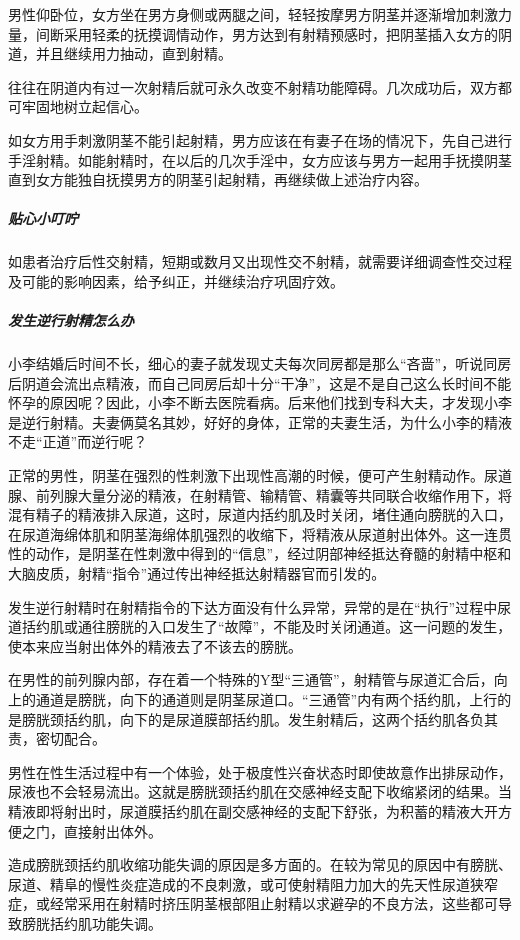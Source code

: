 \begin{enumerate}
男性仰卧位，女方坐在男方身侧或两腿之间，轻轻按摩男方阴茎并逐渐增加刺激力量，间断采用轻柔的抚摸调情动作，男方达到有射精预感时，把阴茎插入女方的阴道，并且继续用力抽动，直到射精。

往往在阴道内有过一次射精后就可永久改变不射精功能障碍。几次成功后，双方都可牢固地树立起信心。

如女方用手刺激阴茎不能引起射精，男方应该在有妻子在场的情况下，先自己进行手淫射精。如能射精时，在以后的几次手淫中，女方应该与男方一起用手抚摸阴茎直到女方能独自抚摸男方的阴茎引起射精，再继续做上述治疗内容。

\subparagraph{贴心小叮咛}

如患者治疗后性交射精，短期或数月又出现性交不射精，就需要详细调查性交过程及可能的影响因素，给予纠正，并继续治疗巩固疗效。

\subparagraph{发生逆行射精怎么办}

小李结婚后时间不长，细心的妻子就发现丈夫每次同房都是那么“吝啬”，听说同房后阴道会流出点精液，而自己同房后却十分“干净”，这是不是自己这么长时间不能怀孕的原因呢？因此，小李不断去医院看病。后来他们找到专科大夫，才发现小李是逆行射精。夫妻俩莫名其妙，好好的身体，正常的夫妻生活，为什么小李的精液不走“正道”而逆行呢？

正常的男性，阴茎在强烈的性刺激下出现性高潮的时候，便可产生射精动作。尿道腺、前列腺大量分泌的精液，在射精管、输精管、精囊等共同联合收缩作用下，将混有精子的精液排入尿道，这时，尿道内括约肌及时关闭，堵住通向膀胱的入口，在尿道海绵体肌和阴茎海绵体肌强烈的收缩下，将精液从尿道射出体外。这一连贯性的动作，是阴茎在性刺激中得到的“信息”，经过阴部神经抵达脊髓的射精中枢和大脑皮质，射精“指令”通过传出神经抵达射精器官而引发的。

发生逆行射精时在射精指令的下达方面没有什么异常，异常的是在“执行”过程中尿道括约肌或通往膀胱的入口发生了“故障”，不能及时关闭通道。这一问题的发生，使本来应当射出体外的精液去了不该去的膀胱。

在男性的前列腺内部，存在着一个特殊的Y型“三通管”，射精管与尿道汇合后，向上的通道是膀胱，向下的通道则是阴茎尿道口。“三通管”内有两个括约肌，上行的是膀胱颈括约肌，向下的是尿道膜部括约肌。发生射精后，这两个括约肌各负其责，密切配合。

男性在性生活过程中有一个体验，处于极度性兴奋状态时即使故意作出排尿动作，尿液也不会轻易流出。这就是膀胱颈括约肌在交感神经支配下收缩紧闭的结果。当精液即将射出时，尿道膜括约肌在副交感神经的支配下舒张，为积蓄的精液大开方便之门，直接射出体外。

造成膀胱颈括约肌收缩功能失调的原因是多方面的。在较为常见的原因中有膀胱、尿道、精阜的慢性炎症造成的不良刺激，或可使射精阻力加大的先天性尿道狭窄症，或经常采用在射精时挤压阴茎根部阻止射精以求避孕的不良方法，这些都可导致膀胱括约肌功能失调。


\end{enumerate}
